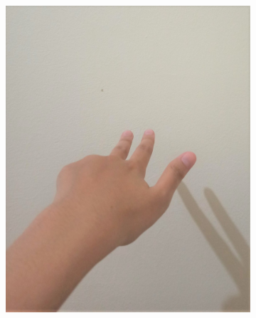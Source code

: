 \documentclass[conference]{IEEEtran}
\begin{document}
\begin{figure} [h]
\begin{center}
\begin{subfigure}[t]{0.11\textwidth}
			\includegraphics[width=\textwidth]{img/pola3a.jpg}
			\caption{\label{fig:gs3a}}
		\end{subfigure}
		\hspace{0.1em}
		\begin{subfigure}[t]{0.11\textwidth}

\end{subfigure}
\end{center}
\end{figure}
\end{document}
